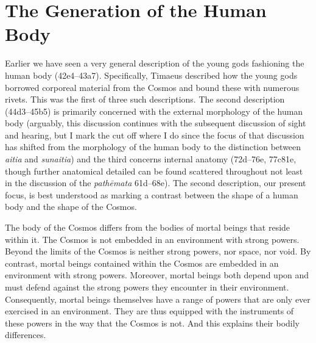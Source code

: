 
\section{The Generation of the Human Body} %
\label{sec:structuring_the_human_body}

Earlier we have seen a very general description of the young gods fashioning the human body (42e4--43a7). Specifically, Timaeus described how the young gods borrowed corporeal material from the Cosmos and bound these with numerous rivets. This was the first of three such descriptions. The second description (44d3--45b5) is primarily concerned with the external morphology of the human body (arguably, this discussion continues with the subsequent discussion of sight and hearing, but I mark the cut off where I do since the focus of that discussion has shifted from the morphology of the human body to the distinction between \emph{aitia} and \emph{sunaitia}) and the third concerns internal anatomy (72d--76e, 77c81e, though further anatomical detailed can be found scattered throughout not least in the discussion of the \emph{pathēmata} 61d--68e). The second description, our present focus, is best understood as marking a contrast between the shape of a human body and the shape of the Cosmos.

The body of the Cosmos differs from the bodies of mortal beings that reside within it. The Cosmos is not embedded in an environment with strong powers. Beyond the limits of the Cosmos is neither strong powers, nor space, nor void. By contrast, mortal beings contained within the Cosmos are embedded in an environment with strong powers. Moreover, mortal beings both depend upon and must defend against the strong powers they encounter in their environment. Consequently, mortal beings themselves have a range of powers that are only ever exercised in an environment. They are thus equipped with the instruments of these powers in the way that the Cosmos is not. And this explains their bodily differences.

